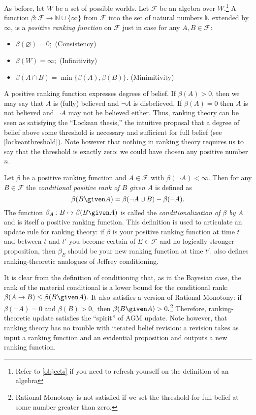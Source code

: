 As before, let $W$ be a set of possible worlds. Let $\mathcal{F}$ be an algebra
over $W$.\footnote{Refer to \autoref{objects} if you need to refresh yourself on
the definition of an algebra} A function $\beta: \mathcal{F} \rightarrow
\mathbb{N} \cup \{\infty\}$ from $\mathcal{F}$ into the set of natural numbers
$\mathbb{N}$ extended by $\infty$, is a {\em positive ranking function} on
$\mathcal{F}$ just in case for any $A,B\in\mathcal{F}$: 
\begin{itemize}
\item[] $\beta(\varnothing)=0;$ \hfill(Consistency)
\item[] $\beta(W)=\infty;$ \hfill(Infinitivity)
\item[] $\beta(A\cap B)=\min \{ \beta(A), \beta(B)\}.$ \hfill(Minimitivity)
\end{itemize}
A positive ranking function expresses degrees of belief. If $\beta(A)>0$, then
we may say that $A$ is (fully) believed and $\neg A$ is disbelieved. If
$\beta(A)=0$ then $A$ is not believed and $\neg A$ may not be believed either.
Thus, ranking theory can be seen as satisfying the ``Lockean thesis,'' the
intuitive proposal that a degree of belief above some threshold is necessary and
sufficient for full belief (see \autoref{lockeanthreshold}). Note however that
nothing in ranking theory requires us to say that the threshold is exactly zero:
we could have chosen any positive number $n$. 

Let $\beta$ be a positive ranking function and $A\in \mathcal{F}$ with
$\beta(\neg A) < \infty.$ Then for any $B\in\mathcal{F}$ the {\em conditional
positive rank of $B$ given $A$} is defined as $$ \beta(B \given A) = \beta(\neg
A \cup B) - \beta(\neg A).$$ The function $\beta_A : B \mapsto \beta(B \given
A)$ is called the {\em conditionalization of $\beta$ by $A$} and is itself a
positive ranking function. This definition is used to articulate an update rule
for ranking theory: if $\beta$ is your positive ranking function at time $t$ and
between $t$ and $t'$ you become certain of $E\in\mathcal{F}$ and no logically
stronger proposition, then $\beta_E$ should be your new ranking function at time
$t'.$ \citet{spohn1988ordinal} also defines ranking-theoretic analogues of
Jeffrey conditioning.

It is clear from the definition of conditioning that, as in the Bayesian case,
the rank of the material conditional is a lower bound for the conditional rank:
$\beta(A\rightarrow B) \leq \beta(B \given A).$ It also satisfies a version of
Rational Monotony: if $\beta(\neg A)=0$ and $\beta(B)>0,$ then $\beta(B \given
A)>0.$\footnote{Rational Monotony is not satisfied if we set the threshold for
full belief at some number greater than zero.} Therefore, ranking-theoretic
update satisfies the ``spirit'' of AGM update. Note however, that ranking theory
has no trouble with iterated belief revision: a revision takes as input a
ranking function and an evidential proposition and outputs a new ranking
function.

